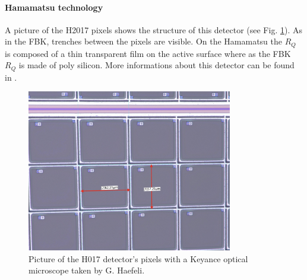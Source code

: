 \paragraph{Hamamatsu technology}
A picture of the H2017 pixels shows the structure of this detector (see Fig. \ref{fig:H2017 pixels picture guido}). As in the FBK, trenches between the pixels are visible. On the Hamamatsu the $R_Q$ is composed of a thin transparent film on the active surface where as the FBK $R_Q$ is made of poly silicon. More informations about this detector can be found in \cite{SurfaceArray}.
\begin{figure}[htbp]
    \centering
    \includegraphics[width=0.8\textwidth]{gfx/pictures/H2017 pixels.jpg}
    \caption{Picture of the H017 detector's pixels with a Keyance optical microscope taken by G. Haefeli. }
    \label{fig:H2017 pixels picture guido}
\end{figure}




